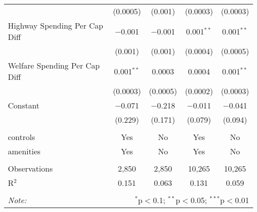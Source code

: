 \begin{table}[!htbp]
\begin{tabular}{@{\extracolsep{5pt}}lcccc}
  & (0.0005) & (0.001) & (0.0003) & (0.0003) \\ 
  Highway Spending Per Cap Diff & $-$0.001 & $-$0.001 & 0.001$^{**}$ & 0.001$^{**}$ \\ 
  & (0.001) & (0.001) & (0.0004) & (0.0005) \\ 
  Welfare Spending Per Cap Diff & 0.001$^{**}$ & 0.0003 & 0.0004 & 0.001$^{**}$ \\ 
  & (0.0003) & (0.0005) & (0.0002) & (0.0003) \\ 
  Constant & $-$0.071 & $-$0.218 & $-$0.011 & $-$0.041 \\ 
  & (0.229) & (0.171) & (0.079) & (0.094) \\ 
 \hline \\[-1.8ex] 
controls & Yes & No & Yes & No \\ 
amenities & Yes & No & Yes & No \\ 
\hline \\[-1.8ex] 
Observations & 2,850 & 2,850 & 10,265 & 10,265 \\ 
R$^{2}$ & 0.151 & 0.063 & 0.131 & 0.059 \\ 
\hline 
\hline \\[-1.8ex] 
\textit{Note:}  & \multicolumn{4}{r}{$^{*}$p$<$0.1; $^{**}$p$<$0.05; $^{***}$p$<$0.01} \\ 
\end{tabular} 
\end{table} 
